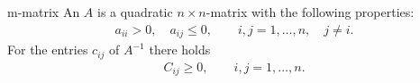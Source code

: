 \begin{Definition}{m-matrix}
  An  $A$ is a quadratic $n\times n$-matrix with the following
  properties:
  \begin{gather}
    \label{eq:m-matrix:1}
    a_{ii} > 0, \quad a_{ij}\le 0,
    \qquad i,j=1,\dots,n, \quad j\neq i.
  \end{gather}
  For the entries $c_{ij}$ of $A^{-1}$ there holds
  \begin{gather}
    \label{eq:m-matrix:2}
    C_{ij} \ge 0, \qquad i,j=1,\dots,n.
  \end{gather}
\end{Definition}

